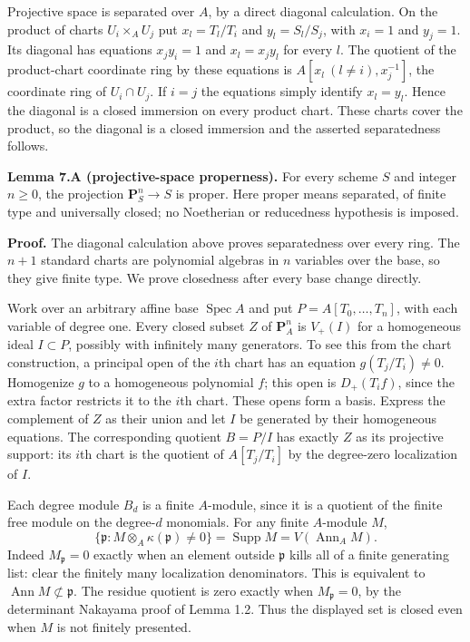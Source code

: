 \documentclass[11pt,a4paper,openany]{report}
\begin{document}
Projective space is separated over \(A\), by a direct diagonal calculation. On the product of charts \(U_i\times_A U_j\) put \(x_l=T_l/T_i\) and \(y_l=S_l/S_j\), with \(x_i=1\) and \(y_j=1\). Its diagonal has equations \(x_jy_i=1\) and \(x_l=x_jy_l\) for every \(l\). The quotient of the product-chart coordinate ring by these equations is \(A[x_l\ (l\ne i),x_j^{-1}]\), the coordinate ring of \(U_i\cap U_j\). If \(i=j\) the equations simply identify \(x_l=y_l\). Hence the diagonal is a closed immersion on every product chart. These charts cover the product, so the diagonal is a closed immersion and the asserted separatedness follows.

\label{AG-RG-S01-projective-properness}

\textbf{Lemma 7.A (projective-space properness).} For every scheme \(S\) and integer \(n\geq0\), the projection \(\mathbf P^n_S\to S\) is proper. Here proper means separated, of finite type and universally closed; no Noetherian or reducedness hypothesis is imposed.

\textbf{Proof.} The diagonal calculation above proves separatedness over every ring. The \(n+1\) standard charts are polynomial algebras in \(n\) variables over the base, so they give finite type. We prove closedness after every base change directly.

Work over an arbitrary affine base \(\operatorname{Spec}A\) and put \(P=A[T_0,\ldots,T_n]\), with each variable of degree one. Every closed subset \(Z\) of \(\mathbf P^n_A\) is \(V_+(I)\) for a homogeneous ideal \(I\subset P\), possibly with infinitely many generators. To see this from the chart construction, a principal open of the \(i\)th chart has an equation \(g(T_j/T_i)\ne0\). Homogenize \(g\) to a homogeneous polynomial \(f\); this open is \(D_+(T_i f)\), since the extra factor restricts it to the \(i\)th chart. These opens form a basis. Express the complement of \(Z\) as their union and let \(I\) be generated by their homogeneous equations. The corresponding quotient \(B=P/I\) has exactly \(Z\) as its projective support: its \(i\)th chart is the quotient of \(A[T_j/T_i]\) by the degree-zero localization of \(I\).

Each degree module \(B_d\) is a finite \(A\)-module, since it is a quotient of the finite free module on the degree-\(d\) monomials. For any finite \(A\)-module \(M\), \[
 \{\mathfrak p:M\otimes_A\kappa(\mathfrak p)\ne0\}
   =\operatorname{Supp}M=V(\operatorname{Ann}_A M).
\] Indeed \(M_{\mathfrak p}=0\) exactly when an element outside \(\mathfrak p\) kills all of a finite generating list: clear the finitely many localization denominators. This is equivalent to \(\operatorname{Ann}M\not\subset\mathfrak p\). The residue quotient is zero exactly when \(M_{\mathfrak p}=0\), by the determinant Nakayama proof of Lemma 1.2. Thus the displayed set is closed even when \(M\) is not finitely presented.
\end{document}
